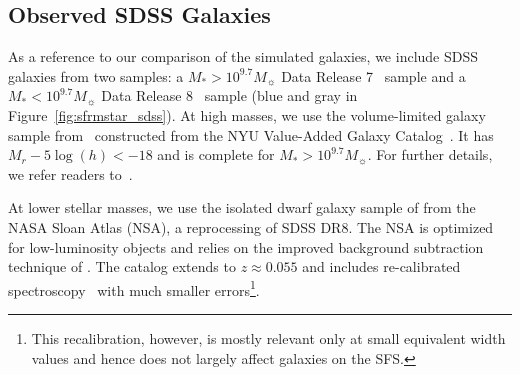 \documentclass[tighten, preprint]{aastex62}
\begin{document}
\subsection{Observed SDSS Galaxies} \label{sec:obvs}
As a reference to our comparison of the simulated galaxies,  %
we include SDSS galaxies from two samples: a 
$M_*{>}10^{9.7} M_\sun$ Data Release 7~\citep[DR7;][]{abazajian2009} sample 
and a $M_* < 10^{9.7} M_\sun$ Data Release 8~\citep[DR8;][]{aihara2011} sample
(blue and gray in Figure~\ref{fig:sfrmstar_sdss}). 
At high masses, we use the volume-limited galaxy sample 
from~\cite{tinker2011} constructed from the NYU Value-Added Galaxy 
Catalog~\citep[VAGC;][]{blanton2005}. It has $M_r - 5\log(h) < -18$
and is complete for $M_* > 10^{9.7} M_\sun$. For further details, 
we refer readers to~\cite{tinker2011,wetzel2013,hahn2017}. 

At lower stellar masses, we use the isolated dwarf galaxy sample 
of \citet{geha2012} from the NASA Sloan Atlas (NSA), a reprocessing 
of SDSS DR8. The NSA is optimized for low-luminosity objects and 
relies on the improved background subtraction technique of 
\cite{blanton2011}. The catalog extends to $z \approx 0.055$ and 
includes re-calibrated spectroscopy~\citep{yan2011,yan2012} 
with much smaller errors\footnote{This recalibration, however, is mostly 
relevant only at small equivalent width values and hence does not 
largely affect galaxies on the SFS.}.%
\end{document}

